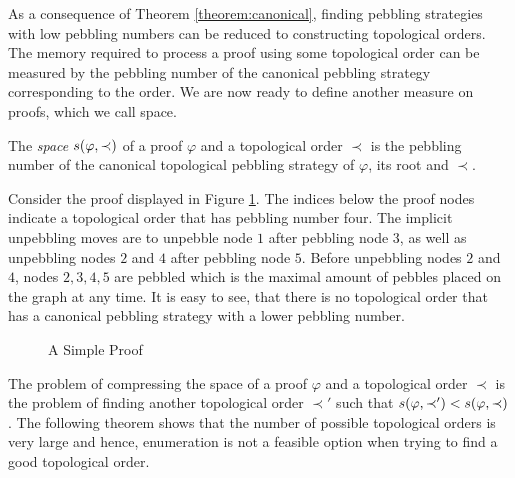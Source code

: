 As a consequence of Theorem \ref{theorem:canonical}, finding pebbling strategies with low pebbling numbers can be reduced to constructing topological orders.
The memory required to process a proof using some topological order can be measured by the pebbling number of the canonical pebbling strategy corresponding to the order.
We are now ready to define another measure on proofs, which we call space.

\begin{definition}
\label{def:space measure}
The \emph{space} $s(\varphi,\prec)$ 
of a proof $\varphi$ and a topological order $\prec$ is the pebbling number of the canonical topological pebbling strategy of $\varphi$, its root and $\prec$.
\end{definition}

\begin{example}

Consider the proof displayed in Figure \ref{fig:spaceproof}.
The indices below the proof nodes indicate a topological order that has pebbling number four.
The implicit unpebbling moves are to unpebble node $1$ after pebbling node $3$, as well as unpebbling nodes $2$ and $4$ after pebbling node $5$.
Before unpebbling nodes $2$ and $4$, nodes $2,3,4,5$ are pebbled which is the maximal amount of pebbles placed on the graph at any time.
It is easy to see, that there is no topological order that has a canonical pebbling strategy with a lower pebbling number.

\begin{figure}[!h]

\caption{A Simple Proof}
\label{fig:spaceproof}
\end{figure}

\end{example}

The problem of compressing the space of a proof $\varphi$ and a topological order $\prec$ is the problem of finding another topological order $\prec'$ such that $s(\varphi,\prec') < s(\varphi,\prec)$. The following theorem shows that the number of possible topological orders is very large and hence, enumeration is not a feasible option when trying to find a good topological order.

